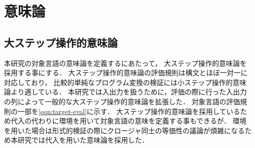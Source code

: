 \documentclass[T]{compsoft}
\newcommand{\keyword}[1]{\mathbf{#1}}
\newcommand{\IF}{\keyword{if}}
\newcommand{\THEN}{\keyword{then}}
\newcommand{\ELSE}{\keyword{else}}
\newcommand{\LET}{\keyword{let}}
\newcommand{\IN}{\keyword{in}}
\begin{document}
%

\section{意味論}\label{section:semantics}

\subsection{大ステップ操作的意味論}
本研究の対象言語の意味論を定義するにあたって，
大ステップ操作的意味論を採用する事にする．
大ステップ操作的意味論の評価規則は構文とほぼ一対一に対応しており，
比較的単純なプログラム変換の検証には小ステップ操作的意味論より適している．
本研究では入出力を扱うために，評価の際に行った入出力の列によって一般的な大ステップ操作的意味論を拡張した．
対象言語の評価規則の一部を\figurename\ref{eqn:target-eval}に示す．
大ステップ操作的意味論を採用しているため代入の代わりに環境を用いて対象言語の意味を定義する事もできるが．
環境を用いた場合は形式的検証の際にクロージャ同士の等価性の議論が煩雑になるため本研究では代入を用いた意味論を採用した．
\end{document}
